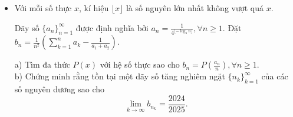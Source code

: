 \documentclass[11pt]{scrartcl}
\begin{document}
\begin{itemize}[label=, leftmargin=0em, itemsep=-0em]
    \item \begin{btvn}
        Với mỗi số thực $x$, kí hiệu $\lfloor x \rfloor$ là số nguyên lớn nhất không vượt quá $x$.


Dãy số $\{a_n \}_{n=1}^{\infty}$ được định nghĩa bởi $a_n = \frac{1}{4^{\lfloor -\log_4 n \rfloor}}, \forall n \geq 1.$ Đặt $b_n = \frac{1}{n^2} \left( \sum_{k=1}^n a_k - \frac{1}{a_1+a_2} \right).$

a) Tìm đa thức $P(x)$ với hệ số thực sao cho $b_n = P \left( \frac{a_n}{n} \right), \forall n \geq 1$.\\
b) Chứng minh rằng tồn tại một dãy số tăng nghiêm ngặt $\{n_k \}_{k=1}^{\infty}$ của các số nguyên dương sao cho$$\lim_{k \to \infty} b_{n_k} = \frac{2024}{2025}.$$
    \end{btvn}

\end{itemize}
\end{document}
